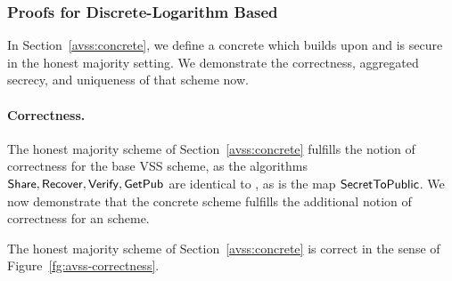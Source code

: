 \subsubsection{Proofs for Discrete-Logarithm Based \AVSS}
\label{appendix:avss-proofs}

In Section~\ref{avss:concrete},
we define a concrete \AVSS which builds upon \FeldVariant and is secure in the honest majority setting.
We demonstrate the correctness,
aggregated secrecy,
and uniqueness of that scheme now.

\paragraph{Correctness.}
The honest majority \AVSS scheme of Section~\ref{avss:concrete} fulfills the notion of correctness for the base VSS scheme,
as the algorithms $\mathsf{Share}, \mathsf{Recover}, \mathsf{Verify}, \mathsf{GetPub}$ are identical to \FeldVariant,
as is the map $\mathsf{SecretToPublic}$.
We now demonstrate that the concrete \AVSS scheme fulfills the additional notion of correctness for an \AVSS scheme.

\begin{theorem}
  The honest majority \AVSS scheme of Section~\ref{avss:concrete} is correct in the sense of Figure~\ref{fg:avss-correctness}.
\end{theorem}


